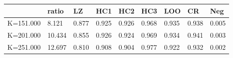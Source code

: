 \begin{table}[ht]
\centering
\begin{tabular}{rllllllll}
  \hline
 & ratio & LZ & HC1 & HC2 & HC3 & LOO & CR & Neg \\ 
  \hline
K=151.000 &  8.121 & 0.877 & 0.925 & 0.926 & 0.968 & 0.935 & 0.938 & 0.005 \\ 
  K=201.000 & 10.434 & 0.855 & 0.926 & 0.924 & 0.969 & 0.934 & 0.941 & 0.003 \\ 
  K=251.000 & 12.697 & 0.810 & 0.908 & 0.904 & 0.977 & 0.922 & 0.932 & 0.002 \\ 
   \hline
\end{tabular}
\end{table}
